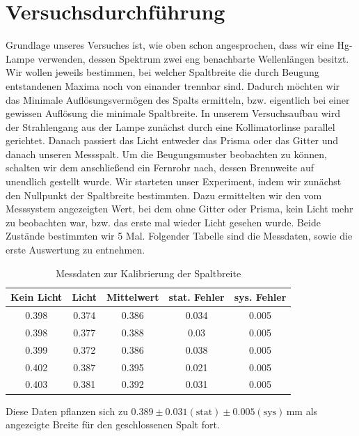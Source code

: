 \documentclass[a4paper, 12pt]{scrartcl}
\begin{document}
\section{Versuchsdurchführung}
Grundlage unseres Versuches ist, wie oben schon angesprochen, dass wir eine Hg-Lampe verwenden, dessen Spektrum zwei eng benachbarte Wellenlängen besitzt. Wir wollen jeweils bestimmen, bei welcher Spaltbreite die durch Beugung entstandenen Maxima noch von einander trennbar sind. Dadurch möchten wir das Minimale Auflösungsvermögen des Spalts ermitteln, bzw. eigentlich bei einer gewissen Auflösung die minimale Spaltbreite.
In unserem Versuchsaufbau wird der Strahlengang aus der Lampe zunächst durch eine Kollimatorlinse parallel gerichtet. Danach passiert das Licht entweder das Prisma oder das Gitter und danach unseren Messspalt. Um die Beugungsmuster beobachten zu können, schalten wir dem anschließend ein Fernrohr nach, dessen Brennweite auf unendlich gestellt wurde.
Wir starteten unser Experiment, indem wir zunächst den Nullpunkt der Spaltbreite bestimmten. Dazu ermittelten wir den vom Messsystem angezeigten Wert, bei dem ohne Gitter oder Prisma, kein Licht mehr zu beobachten war, bzw. das erste mal wieder Licht gesehen wurde. Beide Zustände bestimmten wir 5 Mal. Folgender Tabelle sind die Messdaten, sowie die erste Auswertung zu entnehmen.
\begin{table}[H]\begin{tabular}{c | c | c | c | c}
Kein Licht&Licht&Mittelwert&stat. Fehler&sys. Fehler\\\hline
0.398&0.374&0.386&0.034&0.005\\\hline
0.398&0.377&0.388&0.03&0.005\\\hline
0.399&0.372&0.386&0.038&0.005\\\hline
0.402&0.387&0.395&0.021&0.005\\\hline
0.403&0.381&0.392&0.031&0.005\end{tabular}\caption{Messdaten zur Kalibrierung der Spaltbreite}\end{table}
Diese Daten pflanzen sich zu $0.389\pm0.031(\text{stat})\pm0.005(\text{sys})\,\text{mm}$ als angezeigte Breite für den geschlossenen Spalt fort.
\end{document}
